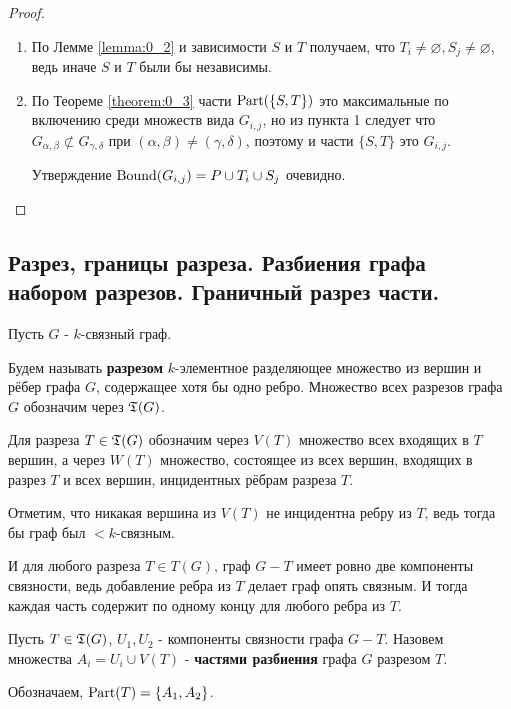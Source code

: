 \begin{proof}
	\begin{enumerate}
		\item По Лемме \ref{lemma:0_2} и зависимости $S$ и  $T$ получаем, что  $T_i \neq \varnothing, S_j \neq \varnothing$, ведь иначе  $S$ и  $T$ были бы независимы.
		\item По Теореме \ref{theorem:0_3} части  $\operatorname{Part}(\{S, T\})$ это максимальные по включению среди множеств вида $G_{i, j}$, но из пункта 1 следует что  $G_{\alpha, \beta} \not \subset G_{\gamma, \delta}$ при  $(\alpha, \beta) \neq (\gamma, \delta)$, поэтому и части $\{S, T\}$ это $G_{i, j}$.
 
			Утверждение  $\operatorname{Bound}(G_{i, j}) = P \cup T_i \cup S_j$ очевидно.
	\end{enumerate}
\end{proof}

\subsection{Разрез, границы разреза. Разбиения графа набором разрезов. Граничный разрез части.}

\begin{df*}[Разрезы]
	Пусть $G$ -  $k$-связный граф.
	
	Будем называть \textbf{разрезом}  $k$-элементное разделяющее множество из вершин и рёбер графа  $G$, содержащее хотя бы одно ребро.
	Множество всех разрезов графа  $G$ обозначим через  $\mathfrak{T}(G)$.

	Для разреза  $T \in \mathfrak{T}(G)$ обозначим через  $V(T)$ множество всех входящих в  $T$ вершин, а через  $W(T)$ множество, состоящее из всех вершин, входящих в разрез  $T$ и всех вершин, инцидентных рёбрам разреза  $T$.
\end{df*}

Отметим, что никакая вершина из $V(T)$ не инцидентна ребру из  $T$, ведь тогда бы граф был  $<k$-связным.

И для любого разреза $T \in T(G)$, граф  $G - T$ имеет ровно две компоненты связности, ведь добавление ребра из  $T$ делает граф опять связным. 
И тогда каждая часть содержит по одному концу для любого ребра из $T$.

\begin{df*}
	Пусть $T \in \mathfrak{T}(G)$,  $U_1, U_2$ - компоненты связности графа $G - T$.
	Назовем множества  $A_i = U_i \cup V(T)$ - \textbf{частями разбиения} графа  $G$ разрезом  $T$.

	Обозначаем,  $\operatorname{Part}(T) = \{A_1, A_2\}$.
\end{df*}


